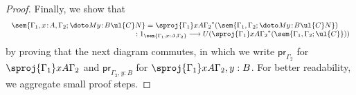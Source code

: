 \begin{proof}
Finally, we show that 
\[
\begin{array}{c}
\hspace{-0.5cm}
\sem{\Gamma_1, x \!:\! A,\Gamma_2;\doto M {y \!:\! B} {\ul{C}} N} = \sproj {\Gamma_1} x A {\Gamma_2}^*(\sem{\Gamma_1,\Gamma_2;\doto M {y \!:\! B} {\ul{C}} N}) 
\\
\hspace{6cm}
: 1_{\sem{\Gamma_1, x : A,\Gamma_2}} \longrightarrow U(\sproj {\Gamma_1} x A {\Gamma_2}^*(\sem{\Gamma_1,\Gamma_2;\ul{C}}))
\end{array}
\]
by proving that the next diagram commutes, in which we write $\mathsf{pr}_{\Gamma_2}$ for $\sproj {\Gamma_1} x A {\Gamma_2}$ and $\mathsf{pr}_{\Gamma_2, y : B}$ for $\sproj {\Gamma_1} x A {\Gamma_2, y : B}$. For better readability, we aggregate small proof steps.


\end{proof}
